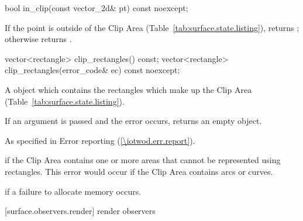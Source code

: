 \begin{itemdecl}
bool in_clip(const vector_2d& pt) const noexcept;
\end{itemdecl}
\begin{itemdescr}
\pnum
\returns
If the point  is outside of the Clip Area (Table~\ref{tab:surface.state.listing}), returns ; otherwise returns .
\end{itemdescr}

\begin{itemdecl}
vector<rectangle> clip_rectangles() const;
vector<rectangle> clip_rectangles(error_code& ec) const noexcept;
\end{itemdecl}
\begin{itemdescr}
\pnum
\returns
A  object which contains the rectangles which make up the Clip Area (Table~\ref{tab:surface.state.listing}).

\pnum
If an  argument is passed and the error  occurs, returns an empty  object.

\pnum
\throws
As specified in Error reporting (\ref{\iotwod.err.report}).

\pnum
\errors
{} if the Clip Area contains one or more areas that cannot be represented using rectangles.
\enterexample
This error would occur if the Clip Area contains arcs or curves.
\exitexample

\pnum
{} if a failure to allocate memory occurs.
\end{itemdescr}

 [surface.observers.render] { render observers}

